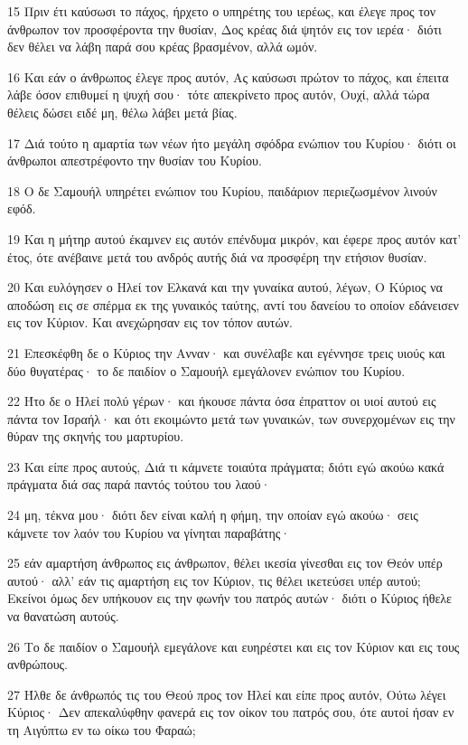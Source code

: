 \par 15 Πριν έτι καύσωσι το πάχος, ήρχετο ο υπηρέτης του ιερέως, και έλεγε προς τον άνθρωπον τον προσφέροντα την θυσίαν, Δος κρέας διά ψητόν εις τον ιερέα· διότι δεν θέλει να λάβη παρά σου κρέας βρασμένον, αλλά ωμόν.
\par 16 Και εάν ο άνθρωπος έλεγε προς αυτόν, Ας καύσωσι πρώτον το πάχος, και έπειτα λάβε όσον επιθυμεί η ψυχή σου· τότε απεκρίνετο προς αυτόν, Ουχί, αλλά τώρα θέλεις δώσει ειδέ μη, θέλω λάβει μετά βίας.
\par 17 Διά τούτο η αμαρτία των νέων ήτο μεγάλη σφόδρα ενώπιον του Κυρίου· διότι οι άνθρωποι απεστρέφοντο την θυσίαν του Κυρίου.
\par 18 Ο δε Σαμουήλ υπηρέτει ενώπιον του Κυρίου, παιδάριον περιεζωσμένον λινούν εφόδ.
\par 19 Και η μήτηρ αυτού έκαμνεν εις αυτόν επένδυμα μικρόν, και έφερε προς αυτόν κατ' έτος, ότε ανέβαινε μετά του ανδρός αυτής διά να προσφέρη την ετήσιον θυσίαν.
\par 20 Και ευλόγησεν ο Ηλεί τον Ελκανά και την γυναίκα αυτού, λέγων, Ο Κύριος να αποδώση εις σε σπέρμα εκ της γυναικός ταύτης, αντί του δανείου το οποίον εδάνεισεν εις τον Κύριον. Και ανεχώρησαν εις τον τόπον αυτών.
\par 21 Επεσκέφθη δε ο Κύριος την Ανναν· και συνέλαβε και εγέννησε τρεις υιούς και δύο θυγατέρας· το δε παιδίον ο Σαμουήλ εμεγάλονεν ενώπιον του Κυρίου.
\par 22 Ήτο δε ο Ηλεί πολύ γέρων· και ήκουσε πάντα όσα έπραττον οι υιοί αυτού εις πάντα τον Ισραήλ· και ότι εκοιμώντο μετά των γυναικών, των συνερχομένων εις την θύραν της σκηνής του μαρτυρίου.
\par 23 Και είπε προς αυτούς, Διά τι κάμνετε τοιαύτα πράγματα; διότι εγώ ακούω κακά πράγματα διά σας παρά παντός τούτου του λαού·
\par 24 μη, τέκνα μου· διότι δεν είναι καλή η φήμη, την οποίαν εγώ ακούω· σεις κάμνετε τον λαόν του Κυρίου να γίνηται παραβάτης·
\par 25 εάν αμαρτήση άνθρωπος εις άνθρωπον, θέλει ικεσία γίνεσθαι εις τον Θεόν υπέρ αυτού· αλλ' εάν τις αμαρτήση εις τον Κύριον, τις θέλει ικετεύσει υπέρ αυτού; Εκείνοι όμως δεν υπήκουον εις την φωνήν του πατρός αυτών· διότι ο Κύριος ήθελε να θανατώση αυτούς.
\par 26 Το δε παιδίον ο Σαμουήλ εμεγάλονε και ευηρέστει και εις τον Κύριον και εις τους ανθρώπους.
\par 27 Ήλθε δε άνθρωπός τις του Θεού προς τον Ηλεί και είπε προς αυτόν, Ούτω λέγει Κύριος· Δεν απεκαλύφθην φανερά εις τον οίκον του πατρός σου, ότε αυτοί ήσαν εν τη Αιγύπτω εν τω οίκω του Φαραώ;
